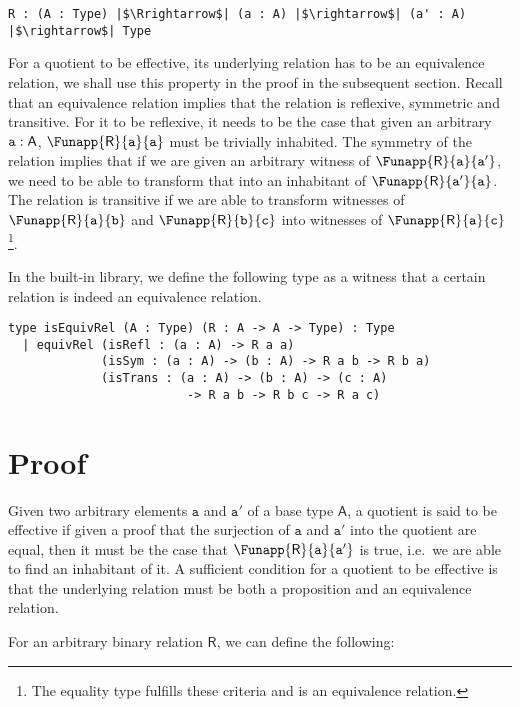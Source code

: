 \documentclass[12pt,twoside,maitrise]{dms}
\theoremstyle{definition}
\numberwithin{equation}{section}
\numberwithin{table}{chapter}
\numberwithin{figure}{chapter}
\newcommand\kw[1] {\textsf{#1}}
\newcommand\id[1] {\texttt{#1}}
\begin{document}
\begin{verbatim}
R : (A : Type) |$\Rrightarrow$| (a : A) |$\rightarrow$| (a' : A) |$\rightarrow$| Type
\end{verbatim}

For a quotient to be effective, its underlying relation has to be an equivalence relation, we shall use this property in the proof in the subsequent section. Recall that an equivalence relation implies that the relation is reflexive, symmetric and transitive. For it to be reflexive, it needs to be the case that given an arbitrary $\oftype{\id{a}}{\kw{A}}$, $\Funapp{\kw{R}}{\id{a}}{\id{a}}$ must be trivially inhabited. The symmetry of the relation implies that if we are given an arbitrary witness of $\Funapp{\kw{R}}{\id{a}}{\id{a}'}$, we need to be able to transform that into an inhabitant of $\Funapp{\kw{R}}{\id{a}'}{\id{a}}$. The relation is transitive if we are able to transform witnesses of $\Funapp{\kw{R}}{\id{a}}{\id{b}}$ and $\Funapp{\kw{R}}{\id{b}}{\id{c}}$ into witnesses of $\Funapp{\kw{R}}{\id{a}}{\id{c}}$\footnote{The equality type fulfills these criteria and is an equivalence relation.}.

In the built-in library, we define the following type as a witness that a certain relation is indeed an equivalence relation.

\begin{verbatim}
type isEquivRel (A : Type) (R : A -> A -> Type) : Type
  | equivRel (isRefl : (a : A) -> R a a)
             (isSym : (a : A) -> (b : A) -> R a b -> R b a)
             (isTrans : (a : A) -> (b : A) -> (c : A)
                         -> R a b -> R b c -> R a c)
\end{verbatim}

\section{Proof}
Given two arbitrary elements $\id{a}$ and $\id{a}'$ of a base type $\kw{A}$, a
quotient is said to be effective if given a proof that the surjection of $\id{a}$
and $\id{a}'$ into the quotient are equal, then it must be the case that
$\Funapp{\kw{R}}{\id{a}}{\id{a}'}$ is true, i.e.\ we are able to find an
inhabitant of it. A sufficient condition for a quotient to be effective is that
the underlying relation must be both a proposition and an equivalence relation.

For an arbitrary binary relation $\kw{R}$, we can define the following:
\end{document}
